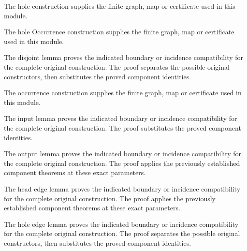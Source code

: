 The hole construction supplies the finite graph, map or certificate used in this module.
\par{}

The hole Occurrence construction supplies the finite graph, map or certificate used in this module.
\par{}

The disjoint lemma proves the indicated boundary or incidence compatibility for the complete original construction.
The proof separates the possible original constructors, then substitutes the proved component identities.
\par{}

The occurrence construction supplies the finite graph, map or certificate used in this module.
\par{}

The input lemma proves the indicated boundary or incidence compatibility for the complete original construction.
The proof substitutes the proved component identities.
\par{}

The output lemma proves the indicated boundary or incidence compatibility for the complete original construction.
The proof applies the previously established component theorems at these exact parameters.
\par{}

The head edge lemma proves the indicated boundary or incidence compatibility for the complete original construction.
The proof applies the previously established component theorems at these exact parameters.
\par{}

The hole edge lemma proves the indicated boundary or incidence compatibility for the complete original construction.
The proof separates the possible original constructors, then substitutes the proved component identities.
\par{}

